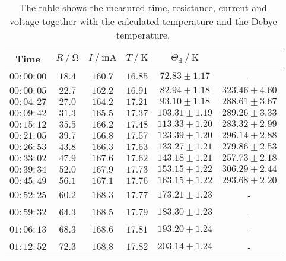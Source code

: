 \begin{table}[H]
    \centering
    \caption{The table shows the measured time, resistance, current and voltage together with the calculated temperature and the Debye temperature.}
    \label{tab:data}
    \begin{tabular}{c c c c c c}
    \toprule
      {Time} & $R \mathbin{/} \unit{\ohm}$ & $I \mathbin{/} \unit{\milli\ampere}$& $T \mathbin{/} \unit{\kelvin}$&$\Theta_\text{d} \mathbin{/} \unit{\kelvin}$ \\
    \midrule
          $00:00:00$  &  $18.4$ &    $160.7$ &   $ 16.85$  & $72.83  \pm 1.17$&                    -   \\    
          $00:00:05$  &  $22.7$ &    $162.2$ &   $ 16.91$  & $82.94  \pm 1.18$&    $323.46 \pm 4.60$   \\    
          $00:04:27$  &  $27.0$ &    $164.2$ &   $ 17.21$  & $93.10  \pm 1.18$&    $288.61 \pm 3.67$   \\    
          $00:09:42$  &  $31.3$ &    $165.5$ &   $ 17.37$  & $103.31 \pm 1.19$&    $289.26 \pm 3.33$   \\    
          $00:15:12$  &  $35.5$ &    $166.2$ &   $ 17.48$  & $113.33 \pm 1.20$&    $283.32 \pm 2.99$   \\    
          $00:21:05$  &  $39.7$ &    $166.8$ &   $ 17.57$  & $123.39 \pm 1.20$&    $296.14 \pm 2.88$   \\    
          $00:26:53$  &  $43.8$ &    $166.3$ &   $ 17.63$  & $133.27 \pm 1.21$&    $279.86 \pm 2.53$   \\    
          $00:33:02$  &  $47.9$ &    $167.6$ &   $ 17.62$  & $143.18 \pm 1.21$&    $257.73 \pm 2.18$   \\    
          $00:39:34$  &  $52.0$ &    $167.9$ &   $ 17.73$  & $153.15 \pm 1.22$&    $306.29 \pm 2.44$   \\    
          $00:45:49$  &  $56.1$ &    $167.1$ &   $ 17.76$  & $163.15 \pm 1.22$&    $293.68 \pm 2.20$   \\    
          $00:52:25$  &  $60.2$ &    $168.3$ &   $ 17.77$  & $173.21 \pm 1.23$&-                       \\    
          $00:59:32$  &  $64.3$ &    $168.5$ &   $ 17.79$  & $183.30 \pm 1.23$&-                       \\    
          $01:06:13$  &  $68.3$ &    $168.6$ &   $ 17.81$  & $193.20 \pm 1.24$&-                       \\    
          $01:12:52$  &  $72.3$ &    $168.8$ &   $ 17.82$  & $203.14 \pm 1.24$&-                       \\    

\end{tabular}
\end{table}
